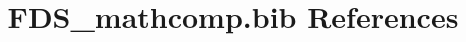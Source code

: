 \documentclass[12pt]{article}
\begin{document}
\nocite{*}
\title{FDS\_mathcomp.bib References}
\maketitle

%



\end{document}
